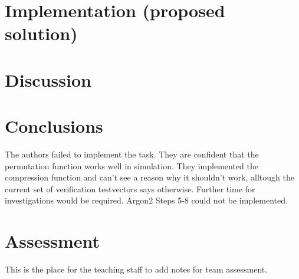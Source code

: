 \documentclass[%
	a4paper,
]
{article}
\begin{document}


%
%
\section{Implementation (proposed solution)}
\label{sec:solution}




%
%
%
%


%
%
\section{Discussion}
\label{sec:discussion}


%
%
\section{Conclusions}
\label{sec:conclusions}
The authors failed to implement the task. 
They are confident that the permutation function works well in simulation.
They implemented the compression function and can't see a reason why it shouldn't work,
alltough the current set of verification testvectors says otherwise.
Further time for investigations would be required.
Argon2 Steps 5-8 could not be implemented.

%
%
\pagebreak
\section{Assessment}
\label{sec:assessment}

This is the place for the teaching staff to add notes for team assessment.
\end{document}
